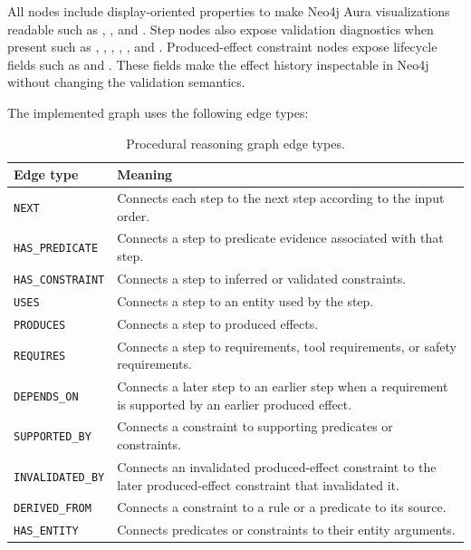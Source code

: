 All nodes include display-oriented properties to make Neo4j Aura visualizations readable such as , , and .
Step nodes also expose validation diagnostics when present such as , ,  , , , and . Produced-effect constraint nodes expose lifecycle fields such as  and . These fields make the effect history inspectable in Neo4j without changing the validation semantics.

The implemented graph uses the following edge types:

\begin{table}[htbp]
\centering
\caption{Procedural reasoning graph edge types.}
\label{tab:implementation-graph-edges}
\begin{tabular}{p{} p{}}
\toprule
Edge type & Meaning \\
\midrule
\texttt{NEXT} & Connects each step to the next step according to the input order. \\
\texttt{HAS\_PREDICATE} & Connects a step to predicate evidence associated with that step. \\
\texttt{HAS\_CONSTRAINT} & Connects a step to inferred or validated constraints. \\
\texttt{USES} & Connects a step to an entity used by the step. \\
\texttt{PRODUCES} & Connects a step to produced effects. \\
\texttt{REQUIRES} & Connects a step to requirements, tool requirements, or safety requirements. \\
\texttt{DEPENDS\_ON} & Connects a later step to an earlier step when a requirement is supported by an earlier produced effect. \\
\texttt{SUPPORTED\_BY} & Connects a constraint to supporting predicates or constraints. \\
\texttt{INVALIDATED\_BY} & Connects an invalidated produced-effect constraint to the later produced-effect constraint that invalidated it. \\
\texttt{DERIVED\_FROM} & Connects a constraint to a rule or a predicate to its source. \\
\texttt{HAS\_ENTITY} & Connects predicates or constraints to their entity arguments. \\
\bottomrule
\end{tabular}
\end{table}


